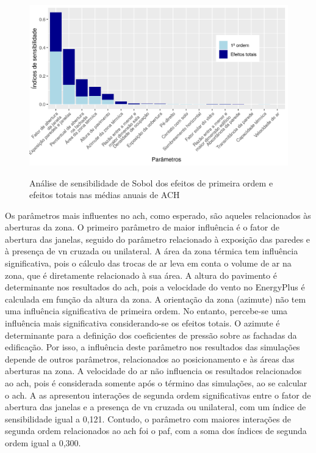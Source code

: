 \documentclass[brazil,hardcopy,openany]{ufscthesis} %
\newcommand{\sasize}{1}
\begin{document}
\begin{figure}[H]
	\centering
	\caption{Análise de sensibilidade de Sobol dos efeitos de primeira ordem e efeitos totais nas médias anuais de ACH}
	\includegraphics[width=\sasize\linewidth]{img/as_ach.png}
	\label{fig:as_ach}
\end{figure}

Os parâmetros mais influentes no \acrshort{ach}, como esperado, são aqueles relacionados às aberturas da zona. 
O primeiro parâmetro de maior influência é o fator de abertura das janelas, seguido do parâmetro relacionado à exposição das paredes e à presença de \acrshort{vn} cruzada ou unilateral. 
A área da zona  térmica tem influência significativa, pois o cálculo das trocas de ar leva em conta o volume de ar na zona, que é diretamente relacionado à sua área. 
A altura do pavimento é determinante nos resultados do \acrshort{ach}, pois a velocidade do vento no EnergyPlus é calculada em função da altura da zona.
A orientação da zona (azimute) não tem uma influência significativa de primeira ordem. No entanto, percebe-se uma influência mais significativa considerando-se os efeitos totais. 
O azimute é determinante para a definição dos coeficientes de pressão sobre as fachadas da edificação. Por isso, a influência deste parâmetro nos resultados das simulações depende de outros parâmetros, relacionados ao posicionamento e às áreas das aberturas na zona.
A velocidade do ar não influencia os resultados relacionados ao \acrshort{ach}, pois é considerada somente após o término das simulações, ao se calcular o \acrshort{ach}.
A \acrshort{as} apresentou interações de segunda ordem significativas entre o fator de abertura das janelas e a presença de \acrshort{vn} cruzada ou unilateral, com um índice de sensibilidade igual a 0,121.
Contudo, o parâmetro com maiores interações de segunda ordem relacionados ao \acrshort{ach} foi o \acrshort{paf}, com a soma dos índices de segunda ordem igual a 0,300.
\end{document}
